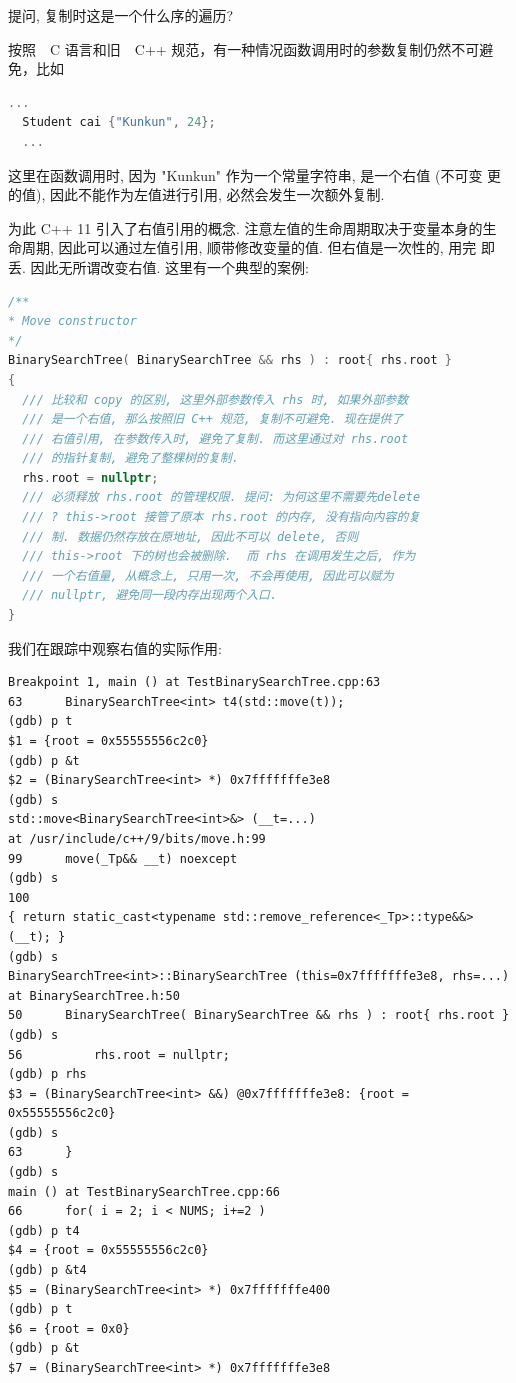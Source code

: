 \documentclass[a4paper]{ctexart}
\theoremstyle{definition}
\theoremstyle{definition}
\begin{document}
提问, 复制时这是一个什么序的遍历?

按照　C 语言和旧　C++ 规范，有一种情况函数调用时的参数复制仍然不可避免，比如
\begin{lstlisting}[language=C++]
  ...
  Student cai {"Kunkun", 24};
  ...
\end{lstlisting}
这里在函数调用时, 因为 "Kunkun" 作为一个常量字符串, 是一个右值 (不可变
更的值), 因此不能作为左值进行引用, 必然会发生一次额外复制.

为此 C++ 11 引入了右值引用的概念. 注意左值的生命周期取决于变量本身的生
命周期, 因此可以通过左值引用, 顺带修改变量的值. 但右值是一次性的, 用完
即丢. 因此无所谓改变右值. 这里有一个典型的案例:

\begin{lstlisting}[language=C++]
/**
* Move constructor
*/
BinarySearchTree( BinarySearchTree && rhs ) : root{ rhs.root }
{
  /// 比较和 copy 的区别, 这里外部参数传入 rhs 时, 如果外部参数
  /// 是一个右值, 那么按照旧 C++ 规范, 复制不可避免. 现在提供了
  /// 右值引用, 在参数传入时, 避免了复制. 而这里通过对 rhs.root
  /// 的指针复制, 避免了整棵树的复制. 
  rhs.root = nullptr;
  /// 必须释放 rhs.root 的管理权限. 提问: 为何这里不需要先delete
  /// ? this->root 接管了原本 rhs.root 的内存, 没有指向内容的复
  /// 制. 数据仍然存放在原地址, 因此不可以 delete, 否则
  /// this->root 下的树也会被删除.  而 rhs 在调用发生之后, 作为
  /// 一个右值量, 从概念上, 只用一次, 不会再使用, 因此可以赋为
  /// nullptr, 避免同一段内存出现两个入口.
}
\end{lstlisting}

我们在跟踪中观察右值的实际作用:

\begin{verbatim}
Breakpoint 1, main () at TestBinarySearchTree.cpp:63
63	    BinarySearchTree<int> t4(std::move(t));
(gdb) p t
$1 = {root = 0x55555556c2c0}
(gdb) p &t
$2 = (BinarySearchTree<int> *) 0x7fffffffe3e8
(gdb) s
std::move<BinarySearchTree<int>&> (__t=...) 
at /usr/include/c++/9/bits/move.h:99
99	    move(_Tp&& __t) noexcept
(gdb) s
100	    
{ return static_cast<typename std::remove_reference<_Tp>::type&&>(__t); }
(gdb) s
BinarySearchTree<int>::BinarySearchTree (this=0x7fffffffe3e8, rhs=...) 
at BinarySearchTree.h:50
50	    BinarySearchTree( BinarySearchTree && rhs ) : root{ rhs.root }
(gdb) s
56			rhs.root = nullptr;
(gdb) p rhs
$3 = (BinarySearchTree<int> &&) @0x7fffffffe3e8: {root = 0x55555556c2c0}
(gdb) s
63	    }
(gdb) s
main () at TestBinarySearchTree.cpp:66
66	    for( i = 2; i < NUMS; i+=2 )
(gdb) p t4
$4 = {root = 0x55555556c2c0}
(gdb) p &t4
$5 = (BinarySearchTree<int> *) 0x7fffffffe400
(gdb) p t
$6 = {root = 0x0}
(gdb) p &t
$7 = (BinarySearchTree<int> *) 0x7fffffffe3e8
\end{verbatim}
\end{document}
